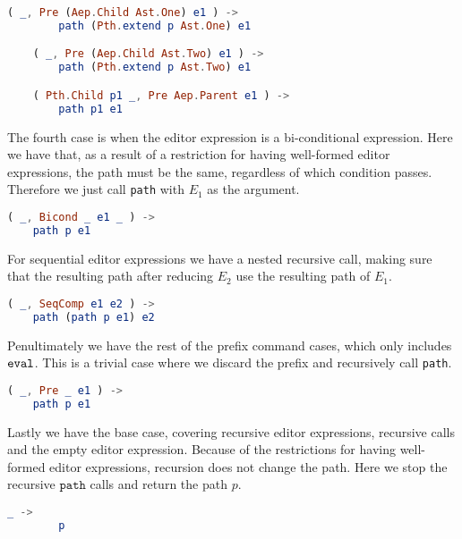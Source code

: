 \begin{lstlisting}[language=elm,%
    gobble=4,%
    ]
    ( _, Pre (Aep.Child Ast.One) e1 ) ->
        path (Pth.extend p Ast.One) e1

    ( _, Pre (Aep.Child Ast.Two) e1 ) ->
        path (Pth.extend p Ast.Two) e1

    ( Pth.Child p1 _, Pre Aep.Parent e1 ) ->
        path p1 e1
\end{lstlisting}

The fourth case is when the editor expression is a bi-conditional expression.
Here we have that, as a result of a restriction for having well-formed editor
expressions, the path must be the same, regardless of which condition passes.
Therefore we just call \texttt{path} with $E_1$ as the argument.

\begin{lstlisting}[language=elm,%
    gobble=4,%
    ]
    ( _, Bicond _ e1 _ ) ->
    path p e1
\end{lstlisting}

For sequential editor expressions we have a nested recursive call, making sure
that the resulting path after reducing $E_2$ use the resulting path of $E_1$.

\begin{lstlisting}[language=elm,%
    gobble=4,%
    ]
    ( _, SeqComp e1 e2 ) ->
    path (path p e1) e2
\end{lstlisting}

Penultimately we have the rest of the prefix command cases, which only includes
$\texttt{eval}$. This is a trivial case where we discard the prefix and recursively
call \texttt{path}.

\begin{lstlisting}[language=elm,%
    gobble=4,%
    ]
    ( _, Pre _ e1 ) ->
    path p e1
\end{lstlisting}

Lastly we have the base case, covering recursive editor expressions, recursive
calls and the empty editor expression. Because of the restrictions for having
well-formed editor expressions, recursion does not change the path. Here we
stop the recursive $\texttt{path}$ calls and return the path $p$.

\begin{lstlisting}[language=elm,%
    gobble=4,%
    ]
    _ ->
        p
\end{lstlisting}

